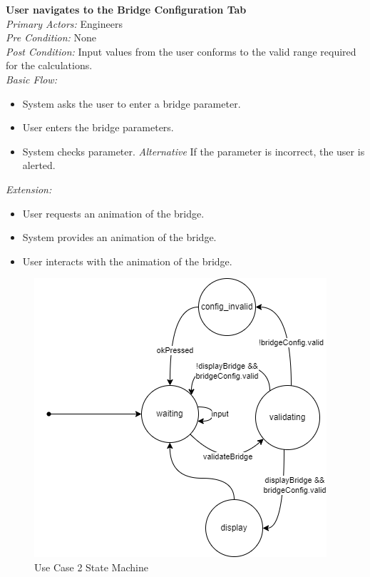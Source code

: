 \documentclass[12pt]{article}
\begin{document}
\noindent
\textbf{User navigates to the Bridge Configuration Tab} \\
\emph{  Primary Actors:} Engineers\\
\emph{  Pre Condition:} None\\
\emph{  Post Condition:} Input values from the user conforms to the valid range required for the calculations.\\ 
\emph{  Basic Flow:} 
\begin{itemize}
\item System asks the user to enter a bridge parameter. 
\item User enters the bridge parameters. 
\item System checks parameter.
\subitem \emph{Alternative} If the parameter is incorrect, the user is alerted.
\end{itemize}
\emph{  Extension:}
\begin{itemize}
\item User requests an animation of the bridge. 
\item System provides an animation of the bridge.
\item User interacts with the animation of the bridge.
\end{itemize}
\begin{figure}[H]
  \centering
  \includegraphics[width=0.5\linewidth]{use-case-2-sm.png}
  \caption{Use Case 2 State Machine}
  \label {fig:use-case-2-sm}
\end{figure}
\end{document}
